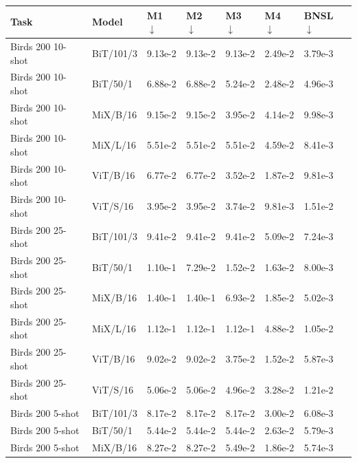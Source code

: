 \documentclass{article} %
\newcommand{\highlight}[1]{\colorbox{blue!10}{#1}}
\begin{document}
\begin{table}
\tiny
\begin{tabular}
{p{}p{}p{}p{}p{}p{}p{}}
\hspace{.9cm}Task & Model & M1 $\downarrow$ & M2 $\downarrow$ & M3 $\downarrow$ & M4 $\downarrow$ & BNSL $\downarrow$ \\
\hline
Birds 200 10-shot & BiT/101/3 & 9.13e-2 & 9.13e-2 & 9.13e-2 & 2.49e-2 & \highlight{3.79e-3} \\
Birds 200 10-shot & BiT/50/1 & 6.88e-2 & 6.88e-2 & 5.24e-2 & 2.48e-2 & \highlight{4.96e-3} \\
Birds 200 10-shot & MiX/B/16 & 9.15e-2 & 9.15e-2 & 3.95e-2 & 4.14e-2 & \highlight{9.98e-3} \\
Birds 200 10-shot & MiX/L/16 & 5.51e-2 & 5.51e-2 & 5.51e-2 & 4.59e-2 & \highlight{8.41e-3} \\
Birds 200 10-shot & ViT/B/16 & 6.77e-2 & 6.77e-2 & 3.52e-2 & 1.87e-2 & \highlight{9.81e-3} \\
Birds 200 10-shot & ViT/S/16 & 3.95e-2 & 3.95e-2 & 3.74e-2 & \highlight{9.81e-3} & 1.51e-2 \\
Birds 200 25-shot & BiT/101/3 & 9.41e-2 & 9.41e-2 & 9.41e-2 & 5.09e-2 & \highlight{7.24e-3} \\
Birds 200 25-shot & BiT/50/1 & 1.10e-1 & 7.29e-2 & 1.52e-2 & 1.63e-2 & \highlight{8.00e-3} \\
Birds 200 25-shot & MiX/B/16 & 1.40e-1 & 1.40e-1 & 6.93e-2 & 1.85e-2 & \highlight{5.02e-3} \\
Birds 200 25-shot & MiX/L/16 & 1.12e-1 & 1.12e-1 & 1.12e-1 & 4.88e-2 & \highlight{1.05e-2} \\
Birds 200 25-shot & ViT/B/16 & 9.02e-2 & 9.02e-2 & 3.75e-2 & 1.52e-2 & \highlight{5.87e-3} \\
Birds 200 25-shot & ViT/S/16 & 5.06e-2 & 5.06e-2 & 4.96e-2 & 3.28e-2 & \highlight{1.21e-2} \\
Birds 200 5-shot & BiT/101/3 & 8.17e-2 & 8.17e-2 & 8.17e-2 & 3.00e-2 & \highlight{6.08e-3} \\
Birds 200 5-shot & BiT/50/1 & 5.44e-2 & 5.44e-2 & 5.44e-2 & 2.63e-2 & \highlight{5.79e-3} \\
Birds 200 5-shot & MiX/B/16 & 8.27e-2 & 8.27e-2 & 5.49e-2 & 1.86e-2 & \highlight{5.74e-3} \\

\end{tabular}
\end{table}
\end{document}
